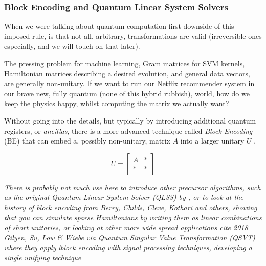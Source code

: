 \subsubsection{Block Encoding and Quantum Linear System Solvers}

When we were talking about quantum computation first downside of this imposed rule, is that not all, arbitrary, transformations are valid 
(irreversible ones especially, and we will touch on that later).

The pressing problem for machine learning, Gram matrices for SVM kernels, 
Hamiltonian matrices describing a desired evolution, and general data vectors, are generally non-unitary.
If we want to run our Netflix recommender system in our brave new, fully quantum (none of this hybrid rubbish), world,
how do we keep the physics happy, whilst computing the matrix we actually want?

Without going into the details, but typically by introducing additional quantum registers, or \emph{ancillas}, 
there is a more advanced technique called \emph{Block Encoding} (BE) that can embed a, possibly non-unitary, matrix $A$ 
into a larger unitary $U$ \cite{Low:2017}.

$$
U = \begin{bmatrix} A & \ast \\ \ast & \ast \end{bmatrix}
$$

\emph{There is probably not much use here to introduce other precursor 
algorithms, such as the original \emph{Quantum Linear System Solver} (QLSS) by \citeauthor{Harrow:2009} \cite{Harrow:2009},
or to look at the history of block encoding from Berry, Childs, Cleve, Kothari and others, 
showing that you can simulate sparse Hamiltonians by writing them as linear combinations of short unitaries,
or looking at other more wide spread applications \emph{cite 2018 Gilyen, Su, Low \& Wiebe} 
via Quantum Singular Value Transformation (QSVT) 
where they apply lblock encoding with signal processing techniques, developing a single unifying technique} 
